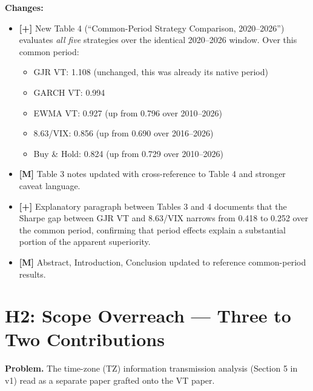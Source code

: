 \documentclass[12pt,a4paper]{article}
\newcommand{\ADD}[1]{\textcolor{addgreen}{\textbf{[+]} #1}}
\newcommand{\MOD}[1]{\textcolor{modblue}{\textbf{[M]} #1}}
\begin{document}
\textbf{Changes:}
\begin{itemize}
\item \ADD{New Table 4 (``Common-Period Strategy Comparison, 2020--2026'')} evaluates \textit{all five} strategies over the identical 2020--2026 window. Over this common period:
  \begin{itemize}
  \item GJR VT: 1.108 (unchanged, this was already its native period)
  \item GARCH VT: 0.994
  \item EWMA VT: 0.927 (up from 0.796 over 2010--2026)
  \item 8.63/VIX: 0.856 (up from 0.690 over 2016--2026)
  \item Buy \& Hold: 0.824 (up from 0.729 over 2010--2026)
  \end{itemize}
\item \MOD{Table 3 notes} updated with cross-reference to Table 4 and stronger caveat language.
\item \ADD{Explanatory paragraph} between Tables 3 and 4 documents that the Sharpe gap between GJR VT and 8.63/VIX narrows from 0.418 to 0.252 over the common period, confirming that period effects explain a substantial portion of the apparent superiority.
\item \MOD{Abstract, Introduction, Conclusion} updated to reference common-period results.
\end{itemize}

\section{H2: Scope Overreach --- Three to Two Contributions}

\textbf{Problem.} The time-zone (TZ) information transmission analysis (Section 5 in v1) read as a separate paper grafted onto the VT paper.
\end{document}
